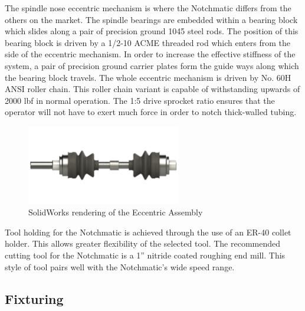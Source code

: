 The spindle nose eccentric mechanism is where the Notchmatic differs from the others on the market. The spindle bearings are embedded within a bearing block which slides along a pair of precision ground 1045 steel rods. The position of this bearing block is driven by a 1/2-10 ACME threaded rod which enters from the side of the eccentric mechanism. In order to increase the effective stiffness of the system, a pair of precision ground carrier plates form the guide ways along which the bearing block travels. The whole eccentric mechanism is driven by No. 60H ANSI roller chain. This roller chain variant is capable of withstanding upwards of 2000 lbf in normal operation. The 1:5 drive sprocket ratio ensures that the operator will not have to exert much force in order to notch thick-walled tubing. 

\begin{figure}[H]
    \centering
    \includegraphics[width=0.6\textwidth]{./fall-report pictures/Chapter2-MachineDescription/Eccentric}
    \caption{SolidWorks rendering of the Eccentric Assembly}
    \label{fig:Eccentric}
\end{figure}

Tool holding for the Notchmatic is achieved through the use of an ER-40 collet holder. This allows greater flexibility of the selected tool. The recommended cutting tool for the Notchmatic is a 1” nitride coated roughing end mill. This style of tool pairs well with the Notchmatic’s wide speed range.

\newpage

\subsection{Fixturing}

